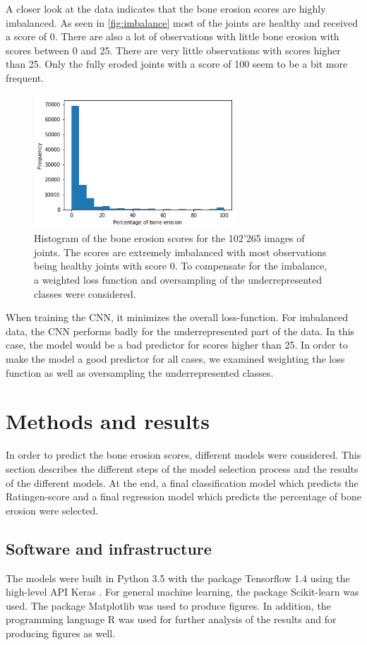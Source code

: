 \documentclass[12pt]{article}
\begin{document}
A closer look at the data indicates that the bone erosion scores are highly imbalanced. As seen in \autoref{fig:imbalance} most of the joints are healthy and received a score of 0. There are also a lot of observations with little bone erosion with scores between 0 and 25. There are very little observations with scores higher than 25. Only the fully eroded joints with a score of 100 seem to be a bit more frequent.

\begin{figure}[ht]
\includegraphics[width=3in]{imbalance}	
\caption{Histogram of the bone erosion scores for the 102'265 images of joints. The scores are extremely imbalanced with most observations being healthy joints with score 0. To compensate for the imbalance, a weighted loss function and oversampling of the underrepresented classes were considered.}
\label{fig:imbalance}
\end{figure}

When training the CNN, it minimizes the overall loss-function. For imbalanced data, the CNN performs badly for the underrepresented part of the data. In this case, the model would be a bad predictor for scores higher than 25. In order to make the model a good predictor for all cases, we examined weighting the loss function as well as oversampling the underrepresented classes.

\clearpage
\section{Methods and results}
\label{sec:methods&results}

In order to predict the bone erosion scores, different models were considered. This section describes the different steps of the model selection process and the results of the different models. At the end, a final classification model which predicts the Ratingen-score and a final regression model which predicts the percentage of bone erosion were selected.

\subsection{Software and infrastructure}
The models were built in Python 3.5 \cite{python} with the package Tensorflow 1.4 \cite{tensorflow} using the high-level API Keras \cite{keras}. For general machine learning, the package Scikit-learn \cite{scikit-learn} was used. The package Matplotlib \cite{matplotlib} was used to produce figures. In addition, the programming language R \cite{r} was used for further analysis of the results and for producing figures as well.
\end{document}
